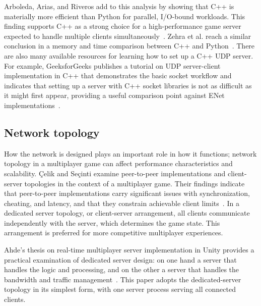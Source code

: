 \IfFileExists{IEEEtran.cls}{\ieeetrue\documentclass[conference]{IEEEtran}}{\ieeefalse\documentclass[twocolumn,10pt]{article}}
\begin{document}
Arboleda, Arias, and Riveros add to this analysis by showing that C++ is materially more efficient than Python for parallel, I/O-bound workloads. This finding supports C++ as a strong choice for a high-performance game server expected to handle multiple clients simultaneously~\cite[p.~8]{arboleda2023}. Zehra et al. reach a similar conclusion in a memory and time comparison between C++ and Python~\cite{zehra2020}. There are also many available resources for learning how to set up a C++ UDP server. For example, GeeksforGeeks publishes a tutorial on UDP server-client implementation in C++ that demonstrates the basic socket workflow and indicates that setting up a server with C++ socket libraries is not as difficult as it might first appear, providing a useful comparison point against ENet implementations~\cite{geeksforgeeks2018}.

\subsection{Network topology}
How the network is designed plays an important role in how it functions; network topology in a multiplayer game can affect performance characteristics and scalability. \c{C}elik and Se\c{c}inti examine peer-to-peer implementations and client-server topologies in the context of a multiplayer game. Their findings indicate that peer-to-peer implementations carry significant issues with synchronization, cheating, and latency, and that they constrain achievable client limits~\cite[p.~48]{celik2024}. In a dedicated server topology, or client-server arrangement, all clients communicate independently with the server, which determines the game state. This arrangement is preferred for more competitive multiplayer experiences.

Ahde's thesis on real-time multiplayer server implementation in Unity provides a practical examination of dedicated server design: on one hand a server that handles the logic and processing, and on the other a server that handles the bandwidth and traffic management~\cite[p.~22]{ahde2017}. This paper adopts the dedicated-server topology in its simplest form, with one server process serving all connected clients.
\end{document}
